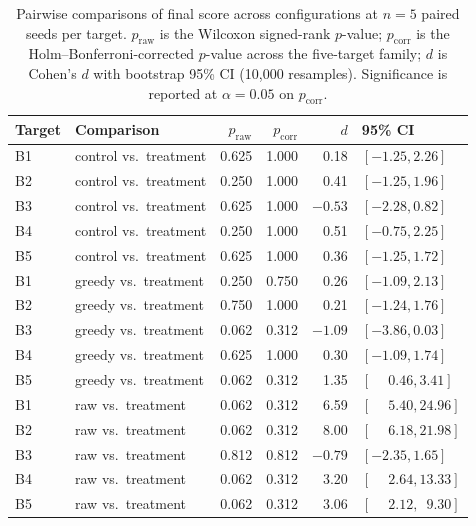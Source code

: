 \begin{table}[t]
  \centering
  \caption{Pairwise comparisons of final score across configurations at $n = 5$ paired seeds per target. $p_{\text{raw}}$ is the Wilcoxon signed-rank $p$-value; $p_{\text{corr}}$ is the Holm--Bonferroni-corrected $p$-value across the five-target family; $d$ is Cohen's $d$ with bootstrap 95\% CI (10{,}000 resamples). Significance is reported at $\alpha = 0.05$ on $p_{\text{corr}}$.}
  \label{tab:e2e-stats}
  \scriptsize
  \begin{tabular}{@{}llrrrl@{}}
    \toprule
    Target & Comparison & $p_{\text{raw}}$ & $p_{\text{corr}}$ & $d$ & 95\% CI \\
    \midrule
    B1 & control vs.\ treatment & 0.625 & 1.000 & 0.18  & $[-1.25, 2.26]$ \\
    B2 & control vs.\ treatment & 0.250 & 1.000 & 0.41  & $[-1.25, 1.96]$ \\
    B3 & control vs.\ treatment & 0.625 & 1.000 & $-0.53$ & $[-2.28, 0.82]$ \\
    B4 & control vs.\ treatment & 0.250 & 1.000 & 0.51  & $[-0.75, 2.25]$ \\
    B5 & control vs.\ treatment & 0.625 & 1.000 & 0.36  & $[-1.25, 1.72]$ \\
    \midrule
    B1 & greedy vs.\ treatment  & 0.250 & 0.750 & 0.26  & $[-1.09, 2.13]$ \\
    B2 & greedy vs.\ treatment  & 0.750 & 1.000 & 0.21  & $[-1.24, 1.76]$ \\
    B3 & greedy vs.\ treatment  & 0.062 & 0.312 & $-1.09$ & $[-3.86, 0.03]$ \\
    B4 & greedy vs.\ treatment  & 0.625 & 1.000 & 0.30  & $[-1.09, 1.74]$ \\
    B5 & greedy vs.\ treatment  & 0.062 & 0.312 & 1.35  & $[\phantom{-}0.46, 3.41]$ \\
    \midrule
    B1 & raw vs.\ treatment     & 0.062 & 0.312 & 6.59  & $[\phantom{-}5.40, 24.96]$ \\
    B2 & raw vs.\ treatment     & 0.062 & 0.312 & 8.00  & $[\phantom{-}6.18, 21.98]$ \\
    B3 & raw vs.\ treatment     & 0.812 & 0.812 & $-0.79$ & $[-2.35, 1.65]$ \\
    B4 & raw vs.\ treatment     & 0.062 & 0.312 & 3.20  & $[\phantom{-}2.64, 13.33]$ \\
    B5 & raw vs.\ treatment     & 0.062 & 0.312 & 3.06  & $[\phantom{-}2.12, \phantom{0}9.30]$ \\
    \bottomrule
  \end{tabular}
\end{table}


